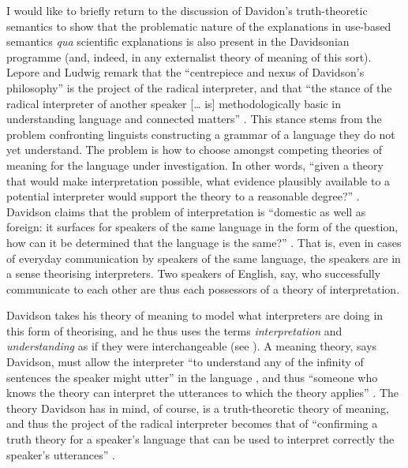 I would like to briefly return to the discussion of Davidon’s truth-theoretic semantics to show that the problematic nature of the explanations in use-based semantics \textit{qua} scientific explanations is also present in the Davidsonian programme (and, indeed, in any externalist theory of meaning of this sort). Lepore and Ludwig remark that the “centrepiece and nexus of Davidson’s philosophy” is the project of the radical interpreter, and that “the stance of the radical interpreter of another speaker [… is] methodologically basic in understanding language and connected matters” \citep[viii, 2]{LeporeLudwig2005}. This stance stems from the problem confronting linguists constructing a grammar of a language they do not yet understand. The problem is how to choose amongst competing theories of meaning for the language under investigation. In other words, “given a theory that would make interpretation possible, what evidence plausibly available to a potential interpreter would support the theory to a reasonable degree?” \citep[125]{Davidson1973}. Davidson claims that the problem of interpretation is “domestic as well as foreign: it surfaces for speakers of the same language in the form of the question, how can it be determined that the language is the same?” \citep[125]{Davidson1973}. That is, even in cases of everyday communication by speakers of the same language, the speakers are in a sense theorising interpreters. Two speakers of English, say, who successfully communicate to each other are thus each possessors of a theory of interpretation. 

Davidson takes his theory of meaning to model what interpreters are doing in this form of theorising, and he thus uses the terms \textit{interpretation} and \textit{understanding} as if they were interchangeable (see \citealt{Mulhall1987}). A meaning theory, says Davidson, must allow the interpreter “to understand any of the infinity of sentences the speaker might utter” in the language \citep[127]{Davidson1973}, and thus “someone who knows the theory can interpret the utterances to which the theory applies” \citep[128]{Davidson1973}. The theory Davidson has in mind, of course, is a truth-theoretic theory of meaning, and thus the project of the radical interpreter becomes that of “confirming a truth theory for a speaker’s language that can be used to interpret correctly the speaker’s utterances” \citep[3]{LeporeLudwig2005}.

